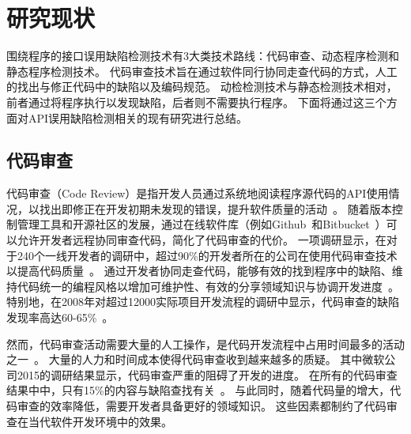 



\section{研究现状}
围绕程序的接口误用缺陷检测技术有3大类技术路线：代码审查、动态程序检测和静态程序检测技术。
代码审查技术旨在通过软件同行协同走查代码的方式，人工的找出与修正代码中的缺陷以及编码规范。
动检检测技术与静态检测技术相对，前者通过将程序执行以发现缺陷，后者则不需要执行程序。
下面将通过这三个方面对API误用缺陷检测相关的现有研究进行总结。

\subsection{代码审查}
代码审查（Code Review）是指开发人员通过系统地阅读程序源代码的API使用情况，以找出即修正在开发初期未发现的错误，提升软件质量的活动~\cite{code-review}。
随着版本控制管理工具和开源社区的发展，通过在线软件库（例如Github~\cite{github}和Bitbucket~\cite{bitbucket}）可以允许开发者远程协同审查代码，简化了代码审查的代价。
一项调研显示，在对于240个一线开发者的调研中，超过90\%的开发者所在的公司在使用代码审查技术以提高代码质量~\cite{17-profes-code-review}。
通过开发者协同走查代码，能够有效的找到程序中的缺陷、维持代码统一的编程风格以增加可维护性、有效的分享领域知识与协调开发进度~\cite{13-icse-code-review}。
特别地，在2008年对超过12000实际项目开发流程的调研中显示，代码审查的缺陷发现率高达60-65\%~\cite{08-code-review}。

然而，代码审查活动需要大量的人工操作，是代码开发流程中占用时间最多的活动之一~\cite{13-esem-code-review}。
大量的人力和时间成本使得代码审查收到越来越多的质疑。
其中微软公司2015的调研结果显示，代码审查严重的阻碍了开发的进度。
在所有的代码审查结果中中，只有15\%的内容与缺陷查找有关~\cite{15-icse-code-review}。
与此同时，随着代码量的增大，代码审查的效率降低，需要开发者具备更好的领域知识。
这些因素都制约了代码审查在当代软件开发环境中的效果。


